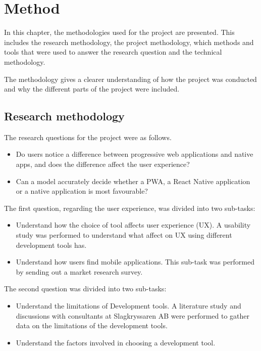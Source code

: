 \section{Method}

In this chapter, the methodologies used for the project are presented. This includes the research methodology, the project methodology, which methods and tools that were used to answer the research question and the technical methodology.

The methodology gives a clearer understanding of how the project was conducted and why the different parts of the project were included.

\subsection{Research methodology}
\label{section:research_methodology}

The research questions for the project were as follows.

\begin{itemize}
    \item Do users notice a difference between progressive web applications and native apps, and does the difference affect the user experience?
    \item Can a model accurately decide whether a PWA, a React Native application or a native application is most favourable?
\end{itemize}

The first question, regarding the user experience, was divided into two sub-tasks:

\begin{itemize}
    \item {Understand how the choice of tool affects user experience (UX)}.
A usability study was performed to understand what affect on UX using different development tools has. 
    \item {Understand how users find mobile applications}.
This sub-task was performed by sending out a market research survey.
\end{itemize}

The second question was divided into two sub-tasks: 

\begin{itemize}
    \item {Understand the limitations of Development tools}.
A literature study and discussions with consultants at Slagkryssaren AB were performed to gather data on the limitations of the development tools.
    \item {Understand the factors involved in choosing a development tool}.
\end{itemize}

